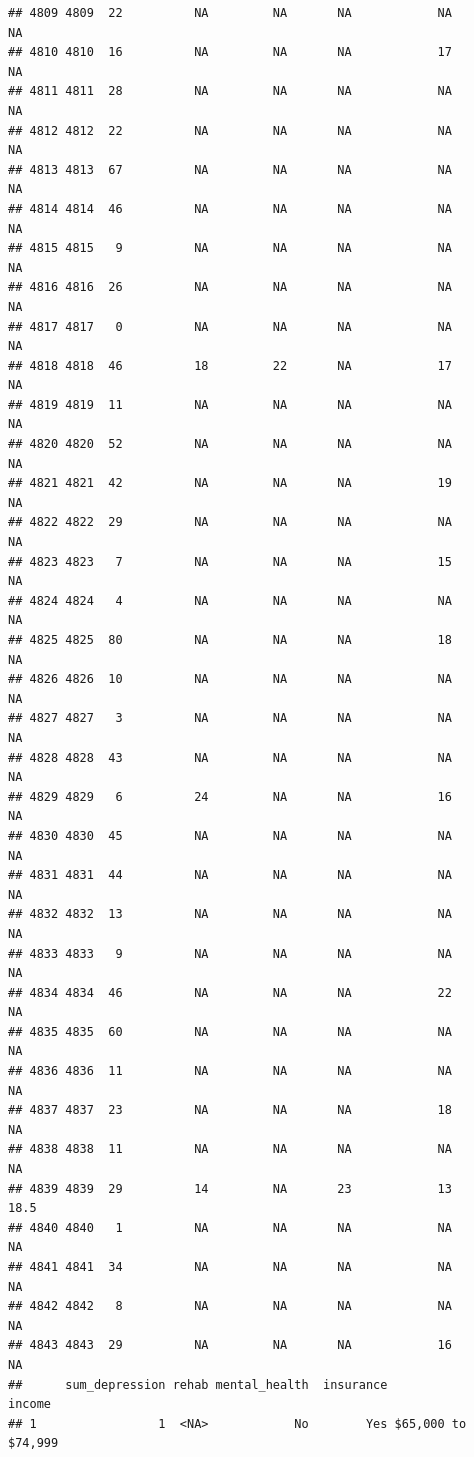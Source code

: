 \documentclass[man]{apa6}
\begin{document}
\begin{verbatim}
## 4809 4809  22          NA         NA       NA            NA       NA
## 4810 4810  16          NA         NA       NA            17       NA
## 4811 4811  28          NA         NA       NA            NA       NA
## 4812 4812  22          NA         NA       NA            NA       NA
## 4813 4813  67          NA         NA       NA            NA       NA
## 4814 4814  46          NA         NA       NA            NA       NA
## 4815 4815   9          NA         NA       NA            NA       NA
## 4816 4816  26          NA         NA       NA            NA       NA
## 4817 4817   0          NA         NA       NA            NA       NA
## 4818 4818  46          18         22       NA            17       NA
## 4819 4819  11          NA         NA       NA            NA       NA
## 4820 4820  52          NA         NA       NA            NA       NA
## 4821 4821  42          NA         NA       NA            19       NA
## 4822 4822  29          NA         NA       NA            NA       NA
## 4823 4823   7          NA         NA       NA            15       NA
## 4824 4824   4          NA         NA       NA            NA       NA
## 4825 4825  80          NA         NA       NA            18       NA
## 4826 4826  10          NA         NA       NA            NA       NA
## 4827 4827   3          NA         NA       NA            NA       NA
## 4828 4828  43          NA         NA       NA            NA       NA
## 4829 4829   6          24         NA       NA            16       NA
## 4830 4830  45          NA         NA       NA            NA       NA
## 4831 4831  44          NA         NA       NA            NA       NA
## 4832 4832  13          NA         NA       NA            NA       NA
## 4833 4833   9          NA         NA       NA            NA       NA
## 4834 4834  46          NA         NA       NA            22       NA
## 4835 4835  60          NA         NA       NA            NA       NA
## 4836 4836  11          NA         NA       NA            NA       NA
## 4837 4837  23          NA         NA       NA            18       NA
## 4838 4838  11          NA         NA       NA            NA       NA
## 4839 4839  29          14         NA       23            13     18.5
## 4840 4840   1          NA         NA       NA            NA       NA
## 4841 4841  34          NA         NA       NA            NA       NA
## 4842 4842   8          NA         NA       NA            NA       NA
## 4843 4843  29          NA         NA       NA            16       NA
##      sum_depression rehab mental_health  insurance             income
## 1                 1  <NA>            No        Yes $65,000 to $74,999

\end{verbatim}
\end{document}
